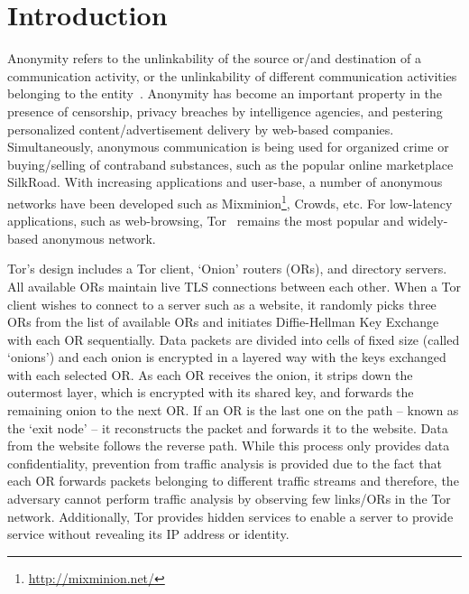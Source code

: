 \section{Introduction}
\label{sec:intro}

Anonymity refers to the unlinkability of the source or\slash and destination of a communication activity, or the unlinkability of different communication activities belonging to the entity~\cite{Pfitzmann2001}. Anonymity has become an important property in the presence of censorship, privacy breaches by intelligence agencies, and pestering personalized content\slash advertisement delivery by web-based companies. Simultaneously, anonymous communication is being used for organized crime or buying\slash selling of contraband substances, such as the popular online marketplace SilkRoad. With increasing applications and user-base, a number of anonymous networks have been developed such as Mixminion\footnote{\url{http://mixminion.net/}}, Crowds\cite{Reiter:1998:CAW:290163.290168}, etc. For low-latency applications, such as web-browsing, Tor~\cite{Dingledine:2004:TSO:1251375.1251396} remains the most popular and widely-based anonymous network.


Tor's design includes a Tor client, `Onion' routers (ORs), and directory servers. All available ORs maintain live TLS connections between each other. When a Tor client wishes to connect to a server such as a website, it randomly picks three ORs from the list of available ORs and initiates Diffie-Hellman Key Exchange with each OR sequentially. Data packets are divided into cells of fixed size (called `onions') and each onion is encrypted in a layered way with the keys exchanged with each selected OR. As each OR receives the onion, it strips down the outermost layer, which is encrypted with its shared key, and forwards the remaining onion to the next OR. If an OR is the last one on the path -- known as the `exit node' -- it reconstructs the packet and forwards it to the website. Data from the website follows the reverse path. While this process only provides data confidentiality, prevention from traffic analysis is provided due to the fact that each OR forwards packets belonging to different traffic streams and therefore, the adversary cannot perform traffic analysis by observing few links/ORs in the Tor network. Additionally, Tor provides hidden services to enable a server to provide service without revealing its IP address or identity.

